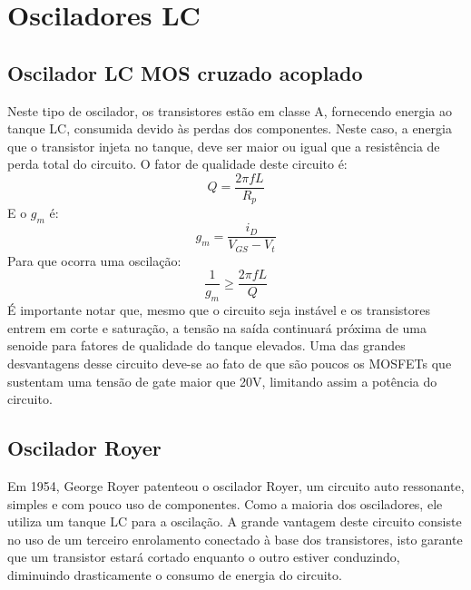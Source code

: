 \chapter{Osciladores LC}\label{chap-1}
\section{Oscilador LC MOS cruzado acoplado}
Neste tipo de oscilador, os transistores estão em classe A, fornecendo energia ao tanque LC, consumida devido às perdas dos componentes. Neste caso, a energia que o transistor injeta no tanque, deve ser maior ou igual que a resistência de perda total do circuito. O fator de qualidade deste circuito é:
\begin{equation}
Q = \frac{2\pi f L}{R_p}
\end{equation}
E o $g_m$ é:
\begin{equation}
g_m = \frac{i_D}{V_{GS} - V_t}
\end{equation}
Para que ocorra uma oscilação:
\begin{equation}
\frac{1}{g_m} \geq \frac{2\pi f L}{Q}
\end{equation}
É importante notar que, mesmo que o circuito seja instável e os transistores entrem em corte e saturação, a tensão na saída continuará próxima de uma senoide para fatores de qualidade do tanque elevados.
Uma das grandes desvantagens desse circuito deve-se ao fato de que são poucos os MOSFETs que sustentam uma tensão de gate maior que 20V, limitando assim a potência do circuito.


\section{Oscilador Royer}
Em 1954, George Royer patenteou o oscilador Royer, um circuito auto ressonante, simples e com pouco uso de componentes. Como a maioria dos osciladores, ele utiliza um tanque LC para a oscilação. A grande vantagem deste circuito consiste no uso de um terceiro enrolamento conectado à base dos transistores, isto garante que um transistor estará cortado enquanto o outro estiver conduzindo, diminuindo drasticamente o consumo de energia do circuito.


